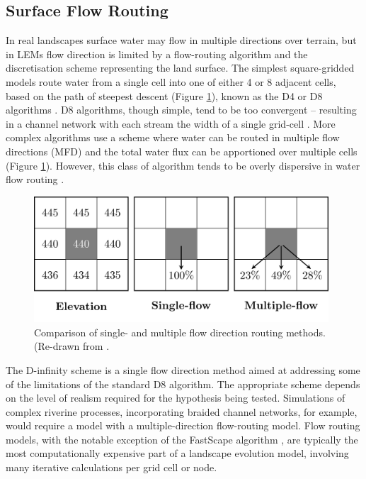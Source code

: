 \subsection{Surface Flow Routing}
In real landscapes surface water may flow in multiple directions over terrain, but in LEMs flow direction is limited by a flow-routing algorithm and the discretisation scheme representing the land surface. The simplest square-gridded models route water from a single cell into one of either 4 or 8 adjacent cells, based on the path of steepest descent (Figure \ref{fig_LEM_flow_routing}), known as the D4 or D8 algorithms \citep{ocallaghan1984extraction}. D8 algorithms, though simple, tend to be too convergent – resulting in a channel network with each stream the width of a single grid-cell \citep{Wilson2008}. More complex algorithms use a scheme where water can be routed in multiple flow directions (MFD) and the total water flux can be apportioned over multiple cells (Figure \ref{fig_LEM_flow_routing}).  However, this class of algorithm tends to be overly dispersive in water flow routing \citep{Wilson2008}. 

\begin{figure}[t]
\includegraphics[width=11cm]{LEMFinalRevisedmanuscriptDAVFinalrevisions-img/LEMFinalRevisedmanuscriptDAVFinalrevisions-img006.png} 
\caption{Comparison of single- and multiple flow direction routing methods. (Re-drawn from \citet{Schauble2008}.}
\label{fig_LEM_flow_routing}
\end{figure}

The D-infinity scheme \citep{Tarboton1997} is a single flow direction method aimed at addressing some of the limitations of the standard D8 algorithm. The appropriate scheme depends on the level of realism required for the hypothesis being tested. Simulations of complex riverine processes, incorporating braided channel networks, for example, would require a model with a multiple-direction flow-routing model.\- Flow routing models, with the notable exception of the FastScape algorithm \citep{Braun2013}, are typically the most computationally expensive part of a landscape evolution model, involving many iterative calculations per grid cell or node.

